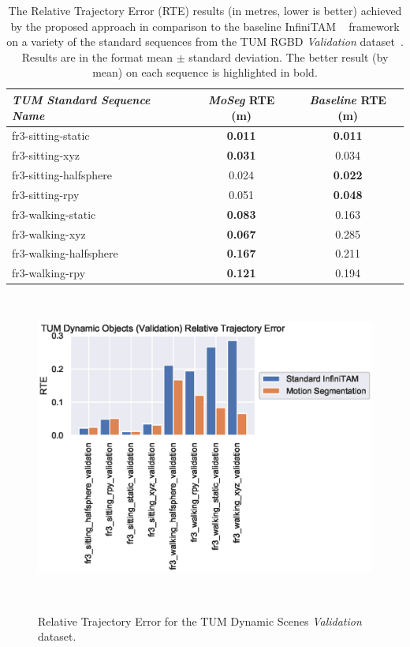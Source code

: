 \begin{table}[!htbp]
\begin{center}
  \begin{tabular}{l c c}
    \emph{TUM Standard Sequence Name} & \emph{MoSeg} RTE (m) & \emph{Baseline} RTE (m) \\
    \midrule
    \textsf{fr3-sitting-static} & \textbf{0.011} & \textbf{0.011}\\
    \textsf{fr3-sitting-xyz} & \textbf{0.031} & 0.034\\
    \textsf{fr3-sitting-halfsphere} & 0.024 & \textbf{0.022}\\
    \textsf{fr3-sitting-rpy} & 0.051 & \textbf{0.048}\\
    \textsf{fr3-walking-static} & \textbf{0.083} & 0.163\\
    \textsf{fr3-walking-xyz} & \textbf{0.067} & 0.285\\
    \textsf{fr3-walking-halfsphere} & \textbf{0.167} & 0.211\\
    \textsf{fr3-walking-rpy} & \textbf{0.121} & 0.194\\
  \end{tabular}
\end{center}
\caption[Motion Segmentation RTE Validation Set]
{The Relative Trajectory Error (RTE) results (in metres, lower is better) 
achieved by the proposed approach in comparison to the baseline InfiniTAM
~\cite{Prisacariu2014} framework on a variety of the standard sequences from
the TUM RGBD \textit{Validation} dataset~\cite{Sturm2012}. Results are in the
format mean \( \pm \) standard deviation. The better result (by mean) on each
sequence is highlighted in bold.}
~\label{table:moseg_rte_validation}
\end{table}

\begin{figure}[!htbp]
  \centering
  \includegraphics[width=0.95\linewidth]{figures/moseg/rte_validation.eps}
  \caption[Motion Segmentation RTE Validation Set]
  {Relative Trajectory Error for the TUM Dynamic Scenes
    \textit{Validation} dataset.}
~\label{figure:moseg_rte_validation}
\end{figure}